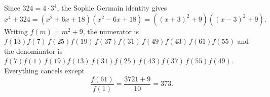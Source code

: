 Since $324=4\cdot3^4$, the Sophie Germain identity gives
\[x^4+324=\left(x^2+6x+18\right)\left(x^2-6x+18\right)=\left((x+3)^2+9\right)\left((x-3)^2+9\right).\]
Writing $f(m)=m^2+9$, the numerator is $f(13)f(7)\,f(25)f(19)\,f(37)f(31)\,f(49)f(43)\,f(61)f(55)$ and the denominator is $f(7)f(1)\,f(19)f(13)\,f(31)f(25)\,f(43)f(37)\,f(55)f(49)$. Everything cancels except
\[\dfrac{f(61)}{f(1)}=\dfrac{3721+9}{10}=\boxed{373}.\]
